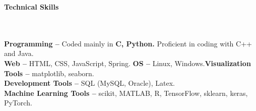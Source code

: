 \documentclass[a4paper,10pt]{article}
\newcommand{\lsep}{-0.5cm}
\newcommand{\resheading}[1]{{\large \colorbox{mygrey}{\begin{minipage}{0.99\textwidth}{\textbf{#1 \vphantom{p\^{E}}}}\end{minipage}}}}
\begin{document}





\resheading{\textbf{Technical Skills} }\\\\[\lsep]

\indent\textbf{Programming -- }Coded mainly in \textbf{C, Python.} Proficient in coding with C++ and Java.\\
\indent\textbf{Web -- } HTML, CSS, JavaScript, Spring. \indent\textbf{OS -- } Linux, Windows.\indent\textbf{Visualization Tools --} matplotlib, seaborn.
\\\indent\textbf{Development Tools --} SQL (MySQL, Oracle), Latex. %
\\\indent\textbf{Machine Learning Tools --} scikit, MATLAB, R, TensorFlow, sklearn, keras, PyTorch.
\\
\end{document}
